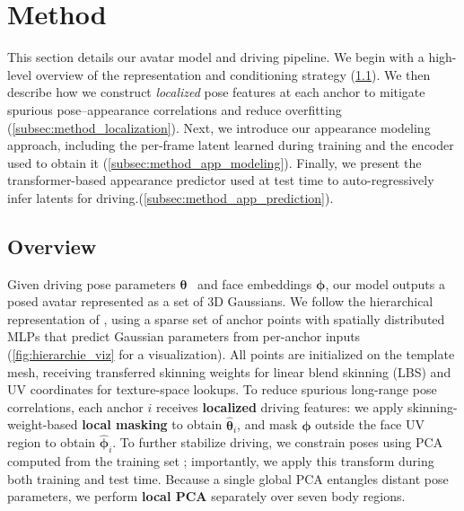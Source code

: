 \documentclass[runningheads]{llncs}
\newcommand{\vect}[1]{\boldsymbol{\mathbf{#1}}}
\begin{document}

\section{Method}
\label{sec:method}

This section details our avatar model and driving pipeline.
We begin with a high-level overview of the representation and conditioning strategy (\cref{subsec:method_overview}).
We then describe how we construct \emph{localized} pose features at each anchor to mitigate spurious pose--appearance correlations and reduce overfitting (\cref{subsec:method_localization}).
Next, we introduce our appearance modeling approach, including the per-frame latent learned during training and the encoder used to obtain it (\cref{subsec:method_app_modeling}).
Finally, we present the transformer-based appearance predictor used at test time to auto-regressively infer latents for driving.(\cref{subsec:method_app_prediction}).

\subsection{Overview}
\label{subsec:method_overview}

Given driving pose parameters $\vect{\theta}$~\cite{meta2025mhr} and face embeddings $\vect{\phi}$, our model outputs a posed avatar represented as a set of 3D Gaussians.
We follow the hierarchical representation of \cite{zhan2025spatialmlps}, using a sparse set of anchor points with spatially distributed MLPs that predict Gaussian parameters from per-anchor inputs (\cf \cref{fig:hierarchie_viz} for a visualization).
All points are initialized on the template mesh, receiving transferred skinning weights for linear blend skinning (LBS) and UV coordinates for texture-space lookups.
To reduce spurious long-range pose correlations, each anchor $i$ receives \textbf{localized} driving features: we apply skinning-weight-based \textbf{local masking} to obtain $\vect{\hat{\theta}}_i$, and mask $\vect{\phi}$ outside the face UV region to obtain $\vect{\hat{\phi}}_i$.
To further stabilize driving, we constrain poses using PCA computed from the training set \cite{li2024animatablegaussians}; importantly, we apply this transform during both training and test time.
Because a single global PCA entangles distant pose parameters, we perform \textbf{local PCA} separately over seven body regions.
\end{document}
